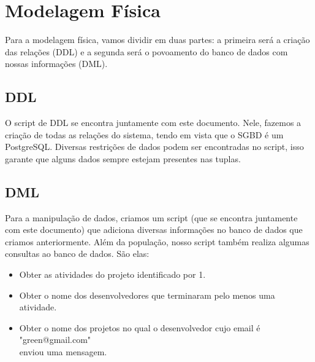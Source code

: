 \documentclass{article}
\begin{document}
\section{Modelagem Física}
	Para a modelagem física, vamos dividir em duas partes: a primeira será a criação das relações (DDL) e a segunda será o povoamento do banco de dados com nossas informações (DML).
	\subsection{DDL}
		O script de DDL se encontra juntamente com este documento. Nele, fazemos a criação de todas as relações do sistema, tendo em vista que o SGBD é um PostgreSQL. Diversas restrições de dados podem ser encontradas no script, isso garante que alguns dados sempre estejam presentes nas tuplas.

	\subsection{DML}
		Para a manipulação de dados, criamos um script (que se encontra juntamente com este documento) que adiciona diversas informações no banco de dados que criamos anteriormente. Além da população, nosso script também realiza algumas consultas ao banco de dados. São elas:
		\begin{itemize}
			\item Obter as atividades do projeto identificado por 1.

			\item Obter o nome dos desenvolvedores que terminaram pelo menos uma atividade.

			\item Obter o nome dos projetos no qual o desenvolvedor cujo email é "green@gmail.com"\\ enviou uma mensagem.

		\end{itemize}
\end{document}
